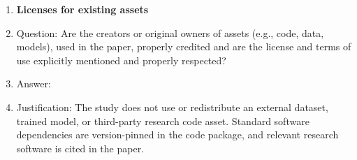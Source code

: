 \begin{enumerate}
\item {\bf Licenses for existing assets}
    \item[] Question: Are the creators or original owners of assets (e.g., code, data, models), used in the paper, properly credited and are the license and terms of use explicitly mentioned and properly respected?
    \item[] Answer: \answerNA{}
    \item[] Justification: The study does not use or redistribute an external
    dataset, trained model, or third-party research code asset. Standard software
    dependencies are version-pinned in the code package, and relevant research
    software is cited in the paper.


\end{enumerate}
